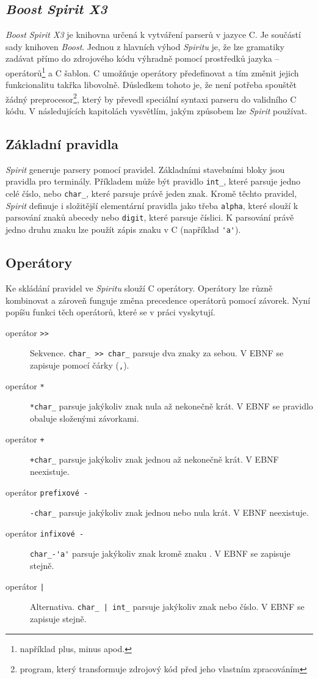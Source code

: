 \documentclass[thesis=B,czech,hidelinks]{FITthesis}[2019/03/06]
\newcommand{\Rplus}{\protect\hspace{-.1em}\protect\raisebox{.35ex}{\smaller{\smaller\textbf{+}}}}
\newcommand{\Cpp}{\mbox{C\Rplus\Rplus}\xspace}
\begin{document}
\subsection{\textit{Boost Spirit X3}}
\textit{Boost Spirit X3} je knihovna určená k vytváření parserů v jazyce \Cpp{}. Je součástí sady knihoven \textit{Boost}. Jednou z hlavních výhod \textit{Spiritu} je, že lze gramatiky zadávat přímo do zdrojového kódu výhradně pomocí prostředků jazyka -- operátorů\footnote{například plus, minus apod.} a \Cpp{} šablon. \Cpp{} umožňuje operátory předefinovat a tím změnit jejich funkcionalitu takřka libovolně. Důsledkem tohoto je, že není potřeba spouštět žádný preprocesor\footnote{program, který transformuje zdrojový kód před jeho vlastním zpracováním}, který by převedl speciální syntaxi parseru do validního \Cpp{} kódu. V následujících kapitolách vysvětlím, jakým způsobem lze \textit{Spirit} používat.

\subsection{Základní pravidla}
\textit{Spirit} generuje parsery pomocí pravidel. Základními stavebními bloky jsou pravidla pro terminály. Příkladem může být pravidlo \verb¨int_¨, které parsuje jedno celé číslo, nebo \verb¨char_¨, které parsuje právě jeden znak. Kromě těchto pravidel, \textit{Spirit} definuje i složitější elementární pravidla jako třeba \texttt{alpha}, které slouží k parsování znaků abecedy nebo \texttt{digit}, které parsuje číslici. K parsování právě jedno druhu znaku lze použít zápis znaku v \Cpp{} (například \verb¨'a'¨).

\subsection{Operátory}
Ke skládání pravidel ve \textit{Spiritu} slouží \Cpp{} operátory. Operátory lze různě kombinovat a zároveň funguje změna precedence operátorů pomocí závorek. Nyní popíšu funkci těch operátorů, které se v práci vyskytují.
\begin{description}
    \item[operátor \texttt{>>}]{Sekvence. \verb¨char_ >> char_¨ parsuje dva znaky za sebou. V EBNF se zapisuje pomocí čárky (\texttt{,}).}
    \item[operátor \texttt{*}]{\verb¨*char_¨ parsuje jakýkoliv znak nula až nekonečně krát. V EBNF se pravidlo obaluje složenými závorkami.}
    \item[operátor \texttt{+}]{\verb¨+char_¨ parsuje jakýkoliv znak jednou až nekonečně krát. V EBNF neexistuje.}
    \item[operátor \texttt{prefixové -}]{\verb¨-char_¨ parsuje jakýkoliv znak jednou nebo nula krát. V EBNF neexistuje.}
    \item[operátor \texttt{infixové -}]{\verb¨char_-'a'¨ parsuje jakýkoliv znak kromě znaku . V EBNF se zapisuje stejně.}
    \item[operátor \texttt{|}]{Alternativa. \verb¨char_ | int_¨ parsuje jakýkoliv znak nebo číslo. V EBNF se zapisuje stejně.}
\end{description}
\end{document}
